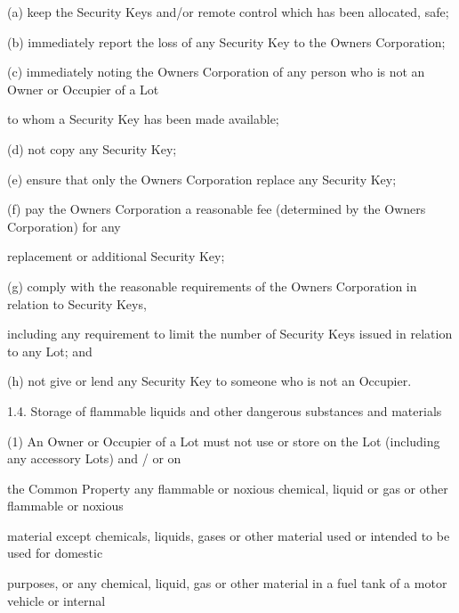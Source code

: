 \documentclass{article}
\begin{document}
{\fontsize{9.962}{1}(a) keep the Security Keys and/or remote control which has been allocated, safe; }

{\fontsize{9.962}{1}(b) immediately report the loss of any Security Key to the Owners Corporation; }

{\fontsize{9.962}{1}(c) immediately noting the Owners Corporation of any person who is not an Owner or Occupier of a Lot }

{\fontsize{10.02}{1}to whom a Security Key has been made available; }

{\fontsize{9.962}{1}(d) not copy any Security Key; }

{\fontsize{9.962}{1}(e) ensure that only the Owners Corporation replace any Security Key; }

{\fontsize{9.962}{1}(f) pay the Owners Corporation a reasonable fee (determined by the Owners Corporation) for any }

{\fontsize{10.02}{1}replacement or additional Security Key; }

{\fontsize{9.962}{1}(g) comply with the reasonable requirements of the Owners Corporation in relation to Security Keys, }

{\fontsize{10.02}{1}including any requirement to limit the number of Security Keys issued in relation to any Lot; and }

{\fontsize{9.962}{1}(h) not give or lend any Security Key to someone who is not an Occupier. }

\newpage



















{\fontsize{9.99}{1}1.4. Storage of flammable liquids and other dangerous substances and materials }

{\fontsize{9.962}{1}(1) An Owner or Occupier of a Lot must not use or store on the Lot (including any accessory Lots) and / or on }

{\fontsize{10.02}{1}the Common Property any flammable or noxious chemical, liquid or gas or other flammable or noxious }

{\fontsize{10.02}{1}material except chemicals, liquids, gases or other material used or intended to be used for domestic }

{\fontsize{10.02}{1}purposes, or any chemical, liquid, gas or other material in a fuel tank of a motor vehicle or internal }
\end{document}
